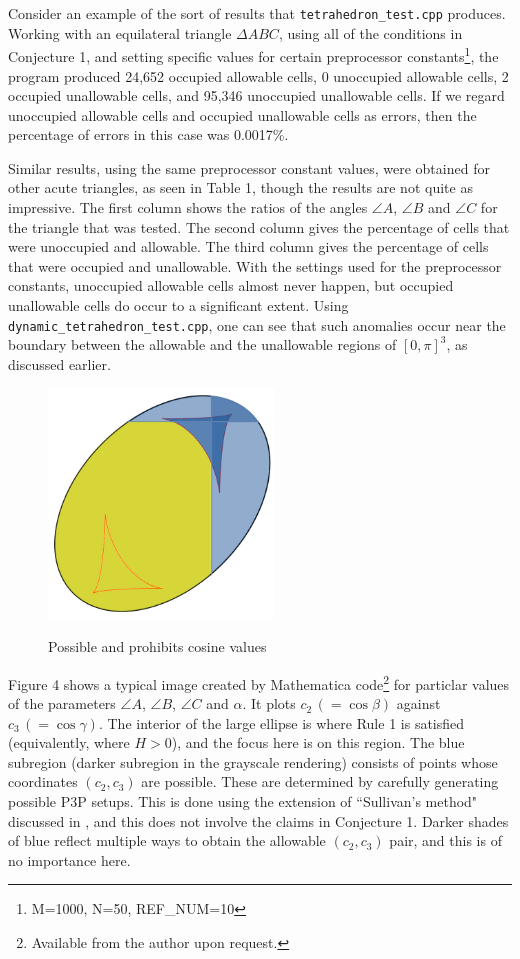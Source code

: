 \documentclass[a4paper, twoside]{article}
\begin{document}
Consider an example of the sort of results that {\tt tetrahedron\_test.cpp} produces. Working with an equilateral triangle $\Delta ABC$, using all of the conditions in Conjecture 1, and setting specific values for certain preprocessor constants\footnote{M=1000, N=50, REF\_NUM=10}, the program produced 24,652 occupied allowable cells, 0 unoccupied allowable cells, 2 occupied unallowable cells, and 95,346 unoccupied unallowable cells. If we regard unoccupied allowable cells and occupied unallowable cells as errors, then the percentage of errors in this case was 0.0017\%. 

Similar results, using the same preprocessor constant values, were obtained for other acute triangles, as seen in Table 1, though the results are not quite as impressive. The first column shows the ratios of the angles $\angle A$, $\angle B$ and $\angle C$ for the triangle that was tested. The second column gives the percentage of cells that were unoccupied and allowable. The third column gives the percentage of cells that were occupied and unallowable. With the settings used for the preprocessor constants, unoccupied allowable cells almost never happen, but occupied unallowable cells do occur to a significant extent. Using {\tt dynamic\_tetrahedron\_test.cpp}, one can see that such anomalies occur near the boundary between the allowable and the unallowable regions of $[0, \pi]^3$, as discussed earlier. \\

\begin{figure} 
\centerline{ \includegraphics[width=6cm]{RA_example_2.jpg} \ }
\caption{Possible and prohibits cosine values}
\end{figure} 

Figure 4 shows a typical image created by Mathematica code\footnote{Available from the author upon request.} for particlar values of the parameters $\angle A$, $\angle B$, $\angle C$ and $\alpha$. It plots $c_2 \, (=\cos\beta)$ against $c_3 \, (=\cos\gamma)$. The interior of the large ellipse is where Rule 1 is satisfied (equivalently, where $H > 0$), and the focus here is on this region. The blue subregion (darker subregion in the grayscale rendering) consists of points whose coordinates $(c_2, c_3)$ are possible. These are determined by carefully generating possible P3P setups. This is done using the extension of ``Sullivan's method" discussed in \cite{R2}, and this does not involve the claims in Conjecture 1. Darker shades of blue reflect multiple ways to obtain the allowable $(c_2, c_3)$ pair, and this is of no importance here. 
\end{document}
